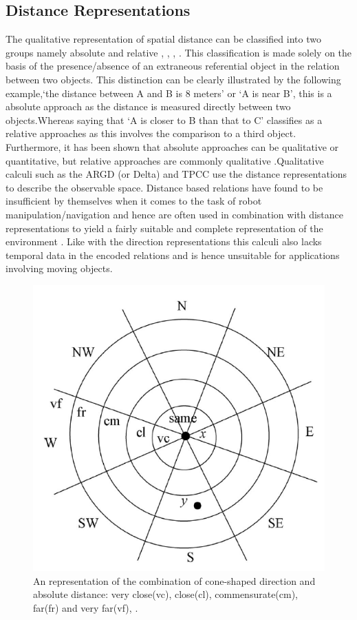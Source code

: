 		\subsection{Distance Representations} The qualitative representation of spatial distance can be classified into two groups namely absolute and relative \cite{isli2000new}, \cite{chen2015survey}, \cite{cohn2001qualitative}, \cite{isli2001combining}. This classification is made solely on the basis of  the presence/absence of an extraneous referential object in the relation between two objects. This distinction can be clearly illustrated by the following example,`the distance between A and B is 8 meters' or `A is near B', this is a absolute approach as the distance is measured directly between two objects.Whereas saying that `A is closer to B than that to C' classifies as a relative approaches as this involves the comparison to a third object. Furthermore, it has been shown that absolute approaches	can be qualitative or quantitative, but relative approaches are commonly qualitative \cite{cohn2001qualitative}.Qualitative calculi such as the ARGD (or Delta) and TPCC use the distance representations to describe the observable space. Distance based relations have found to be insufficient by themselves when it comes to the task of robot manipulation/navigation and hence are often used in combination with distance representations to yield a fairly suitable and complete representation of the environment \cite{chen2015survey}. Like with the direction representations this calculi also lacks temporal data in the encoded relations and is hence unsuitable for applications involving moving objects.
		
		\begin{figure}[h]
			\centering
			\includegraphics[scale=0.8]{images/argd_delta}
			\caption{An representation of the combination of cone-shaped direction and absolute distance: very
				close(vc), close(cl), commensurate(cm), far(fr) and very far(vf), \cite{clementini1997qualitative}.}
			\label{fig:argddelta}
		\end{figure}
		
